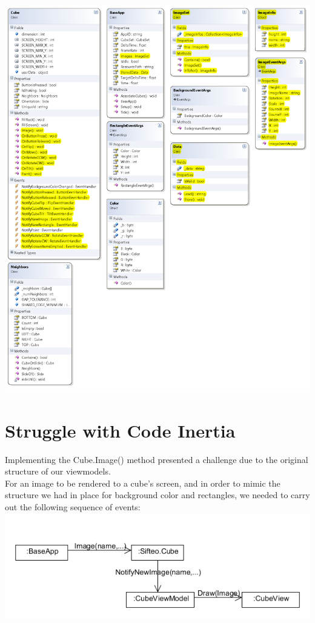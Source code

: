 \documentclass[12pt]{article}
\begin{document}
\includegraphics[scale=.8]{pdfs/SifteoClassDiagram.png}

\clearpage

\section*{Struggle with Code Inertia}
Implementing the Cube.Image() method presented a challenge due to the original structure of our viewmodels. \\

For an image to be rendered to a cube's screen, and in order to mimic the structure we had in place for background color and rectangles, we needed to carry out the following sequence of events: \\
\includegraphics[scale=.8]{pdfs/MS2CodeInertiaDiagram.png}
\end{document}
